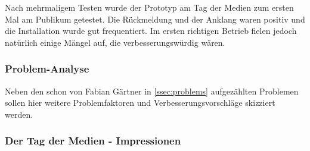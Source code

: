 \label{ssec:Praxis}

Nach mehrmaligem Testen wurde der Prototyp am Tag der Medien zum ersten Mal am Publikum getestet. Die Rückmeldung und der Anklang waren positiv und die Installation wurde gut frequentiert. Im ersten richtigen Betrieb fielen jedoch natürlich einige Mängel auf, die verbesserungswürdig wären.  
 


\subsubsection{Problem-Analyse}
Neben den schon von Fabian Gärtner in \autoref{ssec:problems} aufgezählten Problemen sollen hier weitere Problemfaktoren und Verbesserungsvorschläge skizziert werden.

\subsubsection{Der Tag der Medien - Impressionen}
